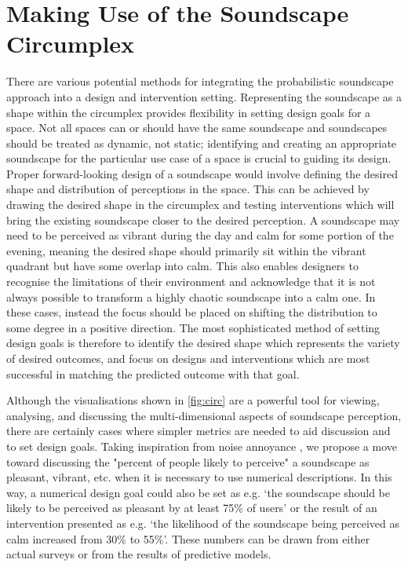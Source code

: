 \section{Making Use of the Soundscape Circumplex}
There are various potential methods for integrating the probabilistic soundscape approach into a design and intervention setting. Representing the soundscape as a shape within the circumplex provides flexibility in setting design goals for a space. Not all spaces can or should have the same soundscape and soundscapes should be treated as dynamic, not static; identifying and creating an appropriate soundscape for the particular use case of a space is crucial to guiding its design. Proper forward-looking design of a soundscape would involve defining the desired shape and distribution of perceptions in the space. This can be achieved by drawing the desired shape in the circumplex and testing interventions which will bring the existing soundscape closer to the desired perception. A soundscape may need to be perceived as vibrant during the day and calm for some portion of the evening, meaning the desired shape should primarily sit within the vibrant quadrant but have some overlap into calm. This also enables designers to recognise the limitations of their environment and acknowledge that it is not always possible to transform a highly chaotic soundscape into a calm one. In these cases, instead the focus should be placed on shifting the distribution to some degree in a positive direction. The most sophisticated method of setting design goals is therefore to identify the desired shape which represents the variety of desired outcomes, and focus on designs and interventions which are most successful in matching the predicted outcome with that goal.

Although the visualisations shown in \cref{fig:circ} are a powerful tool for viewing, analysing, and discussing the multi-dimensional aspects of soundscape perception, there are certainly cases where simpler metrics are needed to aid discussion and to set design goals. Taking inspiration from noise annoyance \citep{ISO15666}, we propose a move toward discussing the "percent of people likely to perceive" a soundscape as pleasant, vibrant, etc. when it is necessary to use numerical descriptions. In this way, a numerical design goal could also be set as e.g. `the soundscape should be likely to be perceived as pleasant by at least 75\% of users' or the result of an intervention presented as e.g. `the likelihood of the soundscape being perceived as calm increased from 30\% to 55\%'. These numbers can be drawn from either actual surveys or from the results of predictive models.

